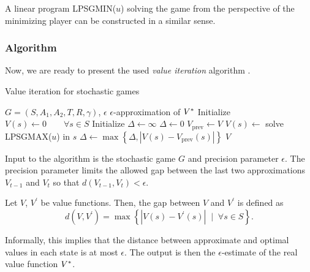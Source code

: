 \documentclass[../main.tex]{subfiles}
\begin{document}
A linear program LPSGMIN($u$) solving the game from the perspective of the minimizing player can be constructed in a similar sense.

\subsubsection{Algorithm}\label{standard:sg:valueiter:algorithm}
Now, we are ready to present the used \textit{value iteration} algorithm .
\begin{algorithm}
    \caption{Value iteration for stochastic games}
    \label{standard:sg:valueiter:algorithm:alg}
    \begin{algorithmic}[1]
        \Require $G = \left(S, A_1, A_2, T, R, \gamma\right)$, $\epsilon$
        \Ensure $\epsilon$-approximation of $V^*$
        \State Initialize $V(s) \leftarrow 0 \qquad \forall s \in S$
        \State Initialize $\Delta \leftarrow \infty$
        \While{$\Delta \geq \epsilon$}
            \State $\Delta \leftarrow 0$
            \State $V_{\text{prev}} \leftarrow V$
                \State $V(s) \leftarrow$ solve LPSGMAX($u$) in $s$  
                \State $\Delta \leftarrow \max\left\{\Delta, |V(s) - V_{\text{prev}}(s)|\right\}$
            \EndFor
        \EndWhile
        \State\Return $V$
    \end{algorithmic}
\end{algorithm}

Input to the algorithm is the stochastic game $G$ and precision parameter $\epsilon$.
The precision parameter limits the allowed gap  between the last two approximations $V_{t-1}$ and $V_t$ so that $d(V_{t-1}, V_t) < \epsilon$.
\begin{definition}\label{standard:sg:valueiter:algorithm:gap}
    Let $V$, $V^{\prime}$ be value functions. Then, the gap between $V$ and $V^{\prime}$ is defined as
    \begin{equation}
        d(V, V^{\prime}) = \max \left\{\left|V(s) - V^{\prime}(s)\right|\;\mid\;\forall s \in S\right\}.
    \end{equation}
\end{definition}
Informally, this implies that the distance between approximate and optimal values in each state is at most $\epsilon$.
The output is then the $\epsilon$-estimate of the real value function $V^*$.
\end{document}
